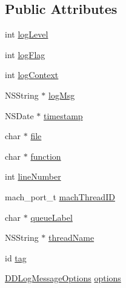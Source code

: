 \subsection*{Public Attributes}
\begin{DoxyCompactItemize}
\item 
int \hyperlink{interface_d_d_log_message_a48c533fab0c670c60f4dbea0a76a3fee}{log\-Level}
\item 
int \hyperlink{interface_d_d_log_message_a92ea97658b57ae4149935acebeab7a24}{log\-Flag}
\item 
int \hyperlink{interface_d_d_log_message_a73dcbc9ddf49e9d958c3b29ec3810375}{log\-Context}
\item 
N\-S\-String $\ast$ \hyperlink{interface_d_d_log_message_aab40334def9cb6d13044e538e66198c2}{log\-Msg}
\item 
N\-S\-Date $\ast$ \hyperlink{interface_d_d_log_message_a405819fd179c0816e2c7a061168429a6}{timestamp}
\item 
char $\ast$ \hyperlink{interface_d_d_log_message_afa29219e2ccb7ca1eefcef23c7743666}{file}
\item 
char $\ast$ \hyperlink{interface_d_d_log_message_a06aa077ba446916d291c2ad2a957b911}{function}
\item 
int \hyperlink{interface_d_d_log_message_a0c059538008557787ae00d93baeb4a41}{line\-Number}
\item 
mach\-\_\-port\-\_\-t \hyperlink{interface_d_d_log_message_a931cbffc35006e3cb25310cb474d5a24}{mach\-Thread\-I\-D}
\item 
char $\ast$ \hyperlink{interface_d_d_log_message_a9bb7f190fe0298be8090708f665c15cf}{queue\-Label}
\item 
N\-S\-String $\ast$ \hyperlink{interface_d_d_log_message_a5b666ceeda61a575e35e52e22a68436c}{thread\-Name}
\item 
id \hyperlink{interface_d_d_log_message_ad3a1f2556f02542c6456d50a690800f1}{tag}
\item 
\hyperlink{_d_d_log_8h_a210ac32524cf9cfeb43d4a361e9bbddc}{D\-D\-Log\-Message\-Options} \hyperlink{interface_d_d_log_message_a9d3b8afd83b3808d7d5d55a05c624ca1}{options}
\end{DoxyCompactItemize}


